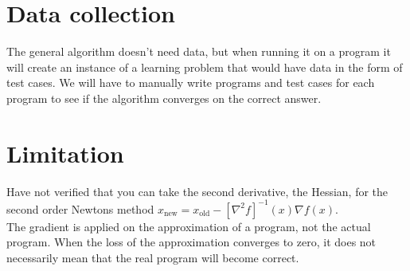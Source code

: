 \documentclass{article}
\begin{document}
\section*{Data collection}
The general algorithm doesn't need data, but when running it on a program it will create an instance of a learning problem that would have data in the form of test cases. We will have to manually write programs and test cases for each program to see if the algorithm converges on the correct answer.

\section*{Limitation}
Have not verified that you can take the second derivative, the Hessian, for the second order Newtons method $x_{\mathrm{new}} = x_{\mathrm{old}} - [\nabla^2 f]^{-1}(x) \nabla f(x)$.\\
The gradient is applied on the approximation of a program, not the actual program. When the loss of the approximation converges to zero, it does not necessarily mean that the real program will become correct.


\end{document}

